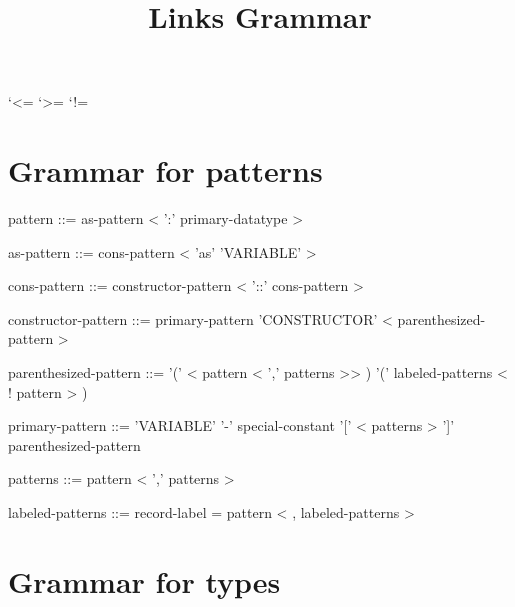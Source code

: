 \documentclass[11pt,a4paper]{article}
\title{Links Grammar}
\date{}
\begin{document}
\maketitle
\tableofcontents

\begingroup
\catcode`<=\active
\catcode`>=\active
\catcode`!=\active
\gdef\setupgrammardefs{
  \catcode`\<=\active \def <{$\langle$}
  \catcode`\>=\active \def >{$\rangle$}
  \catcode`\!=\active \def !{$\mid$}
}

\endgroup

\newenvironment{grammar2}{
  \setupgrammardefs
  \begin{itshape}
    \begin{small}
      \MakeShortVerb{\'}
}{
    \DeleteShortVerb{\'}
    \end{small}
  \end{itshape}
}

\newverbatim{grammar}{}{\begin{grammar2}\VVBnonverbmath}{\end{grammar2}}{}

\section{Grammar for patterns}

\begin{grammar}
pattern ::= as-pattern < ':' primary-datatype > 

as-pattern ::= cons-pattern < 'as' 'VARIABLE' >                               

cons-pattern ::= constructor-pattern < '::' cons-pattern >

constructor-pattern ::= primary-pattern
                        'CONSTRUCTOR' < parenthesized-pattern >

parenthesized-pattern ::= '(' < pattern < ',' patterns >> )
                          '(' labeled-patterns < ! pattern > )

primary-pattern ::= 'VARIABLE'
                    '-'
                    special-constant
                    '[' < patterns > ']'
                    parenthesized-pattern

patterns ::= pattern < ',' patterns >

labeled-patterns ::= record-label = pattern < , labeled-patterns >
\end{grammar}

\section{Grammar for types}
\end{document}
